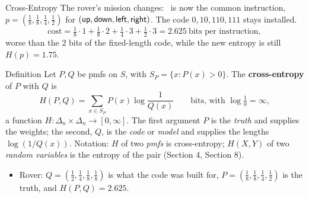 \begin{frame}{Cross-Entropy}
  \small
  The rover's mission changes: \rgt\ is now the common instruction, $p=(\tfrac18,\tfrac18,\tfrac14,\tfrac12)$ for $(\textsf{up},\textsf{down},\textsf{left},\textsf{right})$. The code $0,10,110,111$ stays installed.
  \[
    \text{cost}=\tfrac18\cdot1+\tfrac18\cdot2+\tfrac14\cdot3+\tfrac12\cdot3=2.625\ \text{bits per instruction},
  \]
  worse than the $2$ bits of the fixed-length code, while the new entropy is still $H(p)=1.75$.
  \begin{block}{Definition}
    Let $P,Q$ be pmfs on $S$, with $S_P=\{x:P(x)>0\}$. The \textbf{cross-entropy} of $P$ with $Q$ is
    \[
      H(P,Q)=\sum_{x\in S_P}P(x)\log\frac1{Q(x)}\qquad\text{bits, with }\log\tfrac10=\infty,
    \]
    a function $H\colon\Delta_n\times\Delta_n\to[0,\infty]$. The first argument $P$ is the \emph{truth} and supplies the weights; the second, $Q$, is the \emph{code} or \emph{model} and supplies the lengths $\log(1/Q(x))$.
    Notation: $H$ of two \emph{pmfs} is cross-entropy; $H(X,Y)$ of two \emph{random variables} is the entropy of the pair (Section 4, Section 8).
  \end{block}
  \begin{itemize}
    \item Rover: $Q=(\tfrac12,\tfrac14,\tfrac18,\tfrac18)$ is what the code was built for, $P=(\tfrac18,\tfrac18,\tfrac14,\tfrac12)$ is the truth, and $H(P,Q)=2.625$.
  \end{itemize}
\end{frame}

